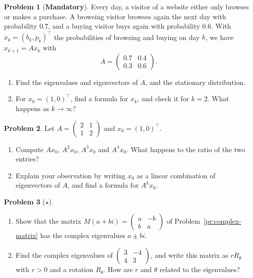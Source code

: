 \documentclass[11pt]{article}
\theoremstyle{definition}
\newtheorem{problem}{Problem}[section]
\newcommand{\mandatory}{\textcolor{red!70!black}{\textbf{Mandatory}}}
\begin{document}
\begin{problem}[\mandatory]\label{pr:eig-markov}
    Every day, a visitor of a website either only browses or makes a purchase. A browsing visitor browses again the next day with probability $0.7$, and a buying visitor buys again with probability $0.6$. With $x_k = (b_k, p_k)^\top$ the probabilities of browsing and buying on day $k$, we have $x_{k+1} = Ax_k$ with
    \[A = \begin{pmatrix} 0.7 & 0.4 \\ 0.3 & 0.6 \end{pmatrix}.\]
    \begin{enumerate}[label=(\alph*)]
        \item Find the eigenvalues and eigenvectors of $A$, and the stationary distribution.
        \item For $x_0 = (1, 0)^\top$, find a formula for $x_k$, and check it for $k = 2$. What happens as $k \to \infty$?
    \end{enumerate}
\end{problem}

\begin{problem}\label{pr:eig-power}
    Let $A = \begin{pmatrix} 2 & 1 \\ 1 & 2 \end{pmatrix}$ and $x_0 = (1, 0)^\top$.
    \begin{enumerate}[label=(\alph*)]
        \item Compute $Ax_0$, $A^2x_0$, $A^3x_0$ and $A^4x_0$. What happens to the ratio of the two entries?
        \item Explain your observation by writing $x_0$ as a linear combination of eigenvectors of $A$, and find a formula for $A^k x_0$.
    \end{enumerate}
\end{problem}

\begin{problem}[$\star$]\label{pr:eig-complex}
    \begin{enumerate}[label=(\alph*)]
        \item Show that the matrix $M(a + bi) = \begin{pmatrix} a & -b \\ b & a \end{pmatrix}$ of Problem~\ref{pr:complex-matrix} has the complex eigenvalues $a \pm bi$.
        \item Find the complex eigenvalues of $\begin{pmatrix} 3 & -4 \\ 4 & 3 \end{pmatrix}$, and write this matrix as $r R_\theta$ with $r > 0$ and a rotation $R_\theta$. How are $r$ and $\theta$ related to the eigenvalues?
    \end{enumerate}
\end{problem}
\end{document}
